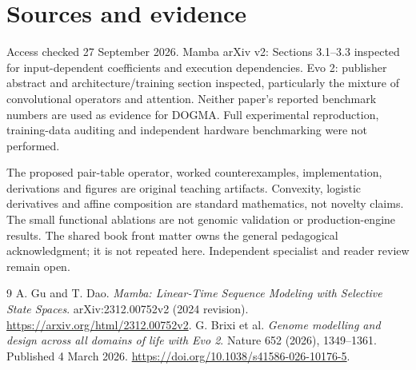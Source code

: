 \section*{Sources and evidence}
Access checked 27 September 2026. Mamba arXiv v2: Sections 3.1--3.3 inspected
for input-dependent coefficients and execution dependencies. Evo 2: publisher
abstract and architecture/training section inspected, particularly the mixture
of convolutional operators and attention. Neither paper's reported benchmark
numbers are used as evidence for DOGMA. Full experimental reproduction,
training-data auditing and independent hardware benchmarking were not performed.

The proposed pair-table operator, worked counterexamples, implementation,
derivations and figures are original teaching artifacts. Convexity, logistic
derivatives and affine composition are standard mathematics, not novelty claims.
The small functional ablations are not genomic validation or production-engine
results. The shared book front matter owns the general pedagogical acknowledgment;
it is not repeated here. Independent specialist and reader review remain open.
\begingroup\let\chapter\section
\begin{thebibliography}{9}
 A. Gu and T. Dao. \emph{Mamba: Linear-Time Sequence Modeling
with Selective State Spaces}. arXiv:2312.00752v2 (2024 revision).
\url{https://arxiv.org/html/2312.00752v2}.
 G. Brixi et al. \emph{Genome modelling and design across all
domains of life with Evo 2}. Nature 652 (2026), 1349--1361.
Published 4 March 2026. \url{https://doi.org/10.1038/s41586-026-10176-5}.
\end{thebibliography}\endgroup
